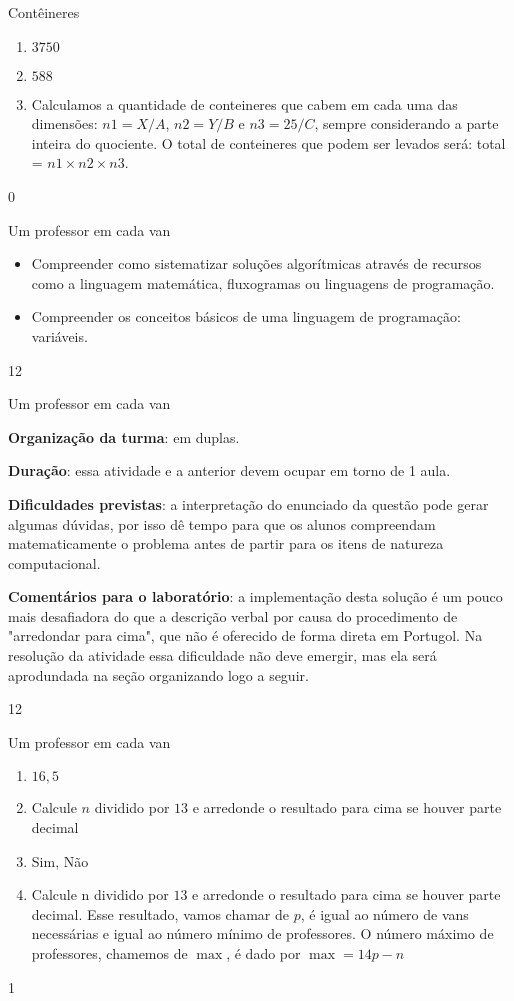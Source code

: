 \marginpar{\vspace{-1em}}
\begin{answer}{Contêineres}
{
\begin{enumerate}
\item $3750$

\item $588$

\item Calculamos a quantidade de conteineres que cabem em cada uma das dimensões: $n1=X/ A$, $n2=Y\slash B$ e $n3=25\slash C$, sempre considerando a parte inteira do quociente. O total de conteineres que podem ser levados será: total = $n1\times n2\times n3$.
\end{enumerate}
}{0}
\end{answer}
\begin{objectives}{Um professor em cada van}
{
\begin{itemize}
\item Compreender como sistematizar soluções algorítmicas através de recursos como a linguagem matemática, fluxogramas ou linguagens de programação.

\item Compreender os conceitos básicos de uma linguagem de programação: variáveis.
\end{itemize}
}{1}{2}
\end{objectives}
\begin{sugestions}{Um professor em cada van}
{
\textbf{Organização da turma}: em duplas.

\textbf{Duração}: essa atividade e a anterior devem ocupar em torno de 1 aula.

\textbf{Dificuldades previstas}: a interpretação do enunciado da questão pode gerar algumas dúvidas, por isso dê tempo para que os alunos compreendam matematicamente o problema antes de partir para os itens de natureza computacional.

\textbf{Comentários para o laboratório}: a implementação desta solução é um pouco mais desafiadora do que a descrição verbal por causa do procedimento de "arredondar para cima", que não é oferecido de forma direta em Portugol. Na resolução da atividade essa dificuldade não deve emergir, mas ela será aprodundada na seção organizando logo a seguir.
}{1}{2}
\end{sugestions}
\begin{answer}{Um professor em cada van}
{
\begin{enumerate}
\item $16{,}5$

\item Calcule $n$ dividido por $13$ e arredonde o resultado para cima se houver parte decimal

\item Sim, Não

\item Calcule n dividido por $13$ e arredonde o resultado para cima se houver parte decimal. Esse resultado, vamos chamar de $p$, é igual ao número de vans necessárias e igual ao número mínimo de professores. O número máximo de professores, chamemos de $\max$, é dado por $\max=14p-n$
\end{enumerate}
}{1}
\end{answer}

